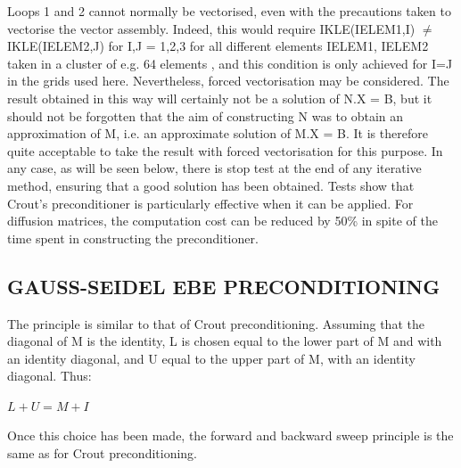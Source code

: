 Loops 1 and 2 cannot normally be vectorised, even with the precautions taken to
vectorise the vector assembly. Indeed, this would require IKLE(IELEM1,I)
$\mathrm{\neq}$ IKLE(IELEM2,J) for I,J = 1,2,3 for all different elements
IELEM1, IELEM2 taken in a cluster of e.g. 64 elements , and this condition is
only achieved for I=J in the grids used here. Nevertheless, forced
vectorisation may be considered. The result obtained in this way will certainly
not be a solution of N.X = B, but it should not be forgotten that the aim of
constructing N was to obtain an approximation of M, i.e. an approximate
solution of M.X = B. It is therefore quite acceptable to take the result with
forced vectorisation for this purpose. In any case, as will be seen below,
there is stop test at the end of any iterative method, ensuring that a good
solution has been obtained. Tests show that Crout's preconditioner is
particularly effective when it can be applied. For diffusion matrices, the
computation cost can be reduced by 50\% in spite of the time spent in
constructing the preconditioner.

\subsection{GAUSS-SEIDEL EBE PRECONDITIONING}

The principle is similar to that of Crout preconditioning. Assuming that the
diagonal of M is the identity, L is chosen equal to the lower part of M and
with an identity diagonal, and U equal to the upper part of M, with an identity
diagonal. Thus:

$L + U = M + I$

Once this choice has been made, the forward and backward sweep principle is the
same as for Crout preconditioning.

